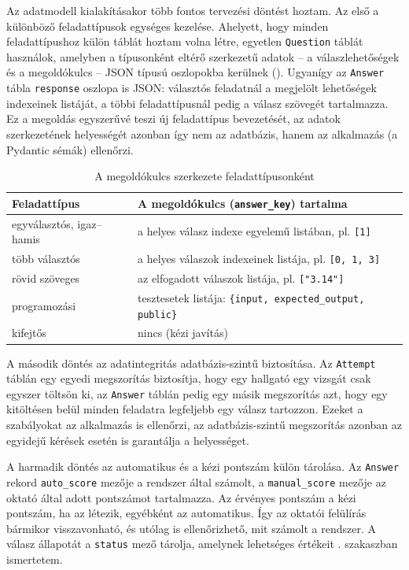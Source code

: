 Az adatmodell kialakításakor több fontos tervezési döntést hoztam. Az első a különböző
feladattípusok egységes kezelése. Ahelyett, hogy minden feladattípushoz külön táblát hoztam
volna létre, egyetlen \texttt{Question} táblát használok, amelyben a típusonként eltérő
szerkezetű adatok -- a válaszlehetőségek és a megoldókulcs -- JSON típusú oszlopokba kerülnek
(). Ugyanígy az \texttt{Answer} tábla \texttt{response} oszlopa is JSON:
választós feladatnál a megjelölt lehetőségek indexeinek listáját, a többi feladattípusnál pedig
a válasz szövegét tartalmazza. Ez a megoldás egyszerűvé teszi új feladattípus bevezetését, az
adatok szerkezetének helyességét azonban így nem az adatbázis, hanem az alkalmazás (a Pydantic
sémák) ellenőrzi.

\begin{table}[H]
  \centering
  \caption{A megoldókulcs szerkezete feladattípusonként}
  \label{tab:megoldokulcs}
  \small
  \begin{tabularx}{\textwidth}{@{}lX@{}}
    \toprule
    Feladattípus & A megoldókulcs (\texttt{answer\_key}) tartalma \\
    \midrule
    egyválasztós, igaz--hamis & a helyes válasz indexe egyelemű listában, pl. \texttt{[1]} \\
    több választós            & a helyes válaszok indexeinek listája, pl. \texttt{[0, 1, 3]} \\
    rövid szöveges            & az elfogadott válaszok listája, pl. \texttt{["3.14"]} \\
    programozási              & tesztesetek listája: \texttt{\{input, expected\_output, public\}} \\
    kifejtős                  & nincs (kézi javítás) \\
    \bottomrule
  \end{tabularx}
\end{table}

A második döntés az adatintegritás adatbázis-szintű biztosítása. Az \texttt{Attempt} táblán egy
egyedi megszorítás biztosítja, hogy egy hallgató egy vizsgát csak egyszer töltsön ki, az
\texttt{Answer} táblán pedig egy másik megszorítás azt, hogy egy kitöltésen belül minden
feladatra legfeljebb egy válasz tartozzon. Ezeket a szabályokat az alkalmazás is ellenőrzi, az
adatbázis-szintű megszorítás azonban az egyidejű kérések esetén is garantálja a helyességet.

A harmadik döntés az automatikus és a kézi pontszám külön tárolása. Az \texttt{Answer} rekord
\texttt{auto\_score} mezője a rendszer által számolt, a \texttt{manual\_score} mezője az oktató
által adott pontszámot tartalmazza. Az érvényes pontszám a kézi pontszám, ha az létezik, egyébként
az automatikus. Így az oktatói felülírás bármikor visszavonható, és utólag is ellenőrizhető, mit
számolt a rendszer. A válasz állapotát a \texttt{status} mező tárolja, amelynek lehetséges értékeit
. szakaszban ismertetem.

